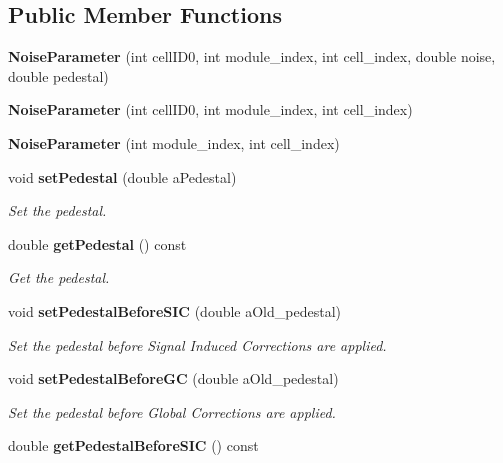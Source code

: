 \subsection*{Public Member Functions}
\begin{DoxyCompactItemize}
\item 
{\bfseries Noise\-Parameter} (int cell\-I\-D0, int module\-\_\-index, int cell\-\_\-index, double noise, double pedestal)\label{classCALICE_1_1NoiseParameter_a5ae8a2eda536c5234c898a1fed313103}

\item 
{\bfseries Noise\-Parameter} (int cell\-I\-D0, int module\-\_\-index, int cell\-\_\-index)\label{classCALICE_1_1NoiseParameter_adf999180ff627b662343e5069db133d7}

\item 
{\bfseries Noise\-Parameter} (int module\-\_\-index, int cell\-\_\-index)\label{classCALICE_1_1NoiseParameter_ac3ad7f004d153853a1e2a800a4018e29}

\item 
void {\bf set\-Pedestal} (double a\-Pedestal)\label{classCALICE_1_1NoiseParameter_a1b356206a293f69bf1ed40d27ecb818b}

\begin{DoxyCompactList}\small\item\em Set the pedestal. \end{DoxyCompactList}\item 
double {\bf get\-Pedestal} () const \label{classCALICE_1_1NoiseParameter_adb7a5b09ba13a4f638df6d60b59c9587}

\begin{DoxyCompactList}\small\item\em Get the pedestal. \end{DoxyCompactList}\item 
void {\bf set\-Pedestal\-Before\-S\-I\-C} (double a\-Old\-\_\-pedestal)\label{classCALICE_1_1NoiseParameter_a3388d4aae5f8d532667b38ac4e9af8a6}

\begin{DoxyCompactList}\small\item\em Set the pedestal before Signal Induced Corrections are applied. \end{DoxyCompactList}\item 
void {\bf set\-Pedestal\-Before\-G\-C} (double a\-Old\-\_\-pedestal)\label{classCALICE_1_1NoiseParameter_ab20b21bb8db009637332f8b15471fc7f}

\begin{DoxyCompactList}\small\item\em Set the pedestal before Global Corrections are applied. \end{DoxyCompactList}\item 
double {\bf get\-Pedestal\-Before\-S\-I\-C} () const \label{classCALICE_1_1NoiseParameter_a8aa648b980a102191797e806bec1fe1b}


\end{DoxyCompactItemize}
